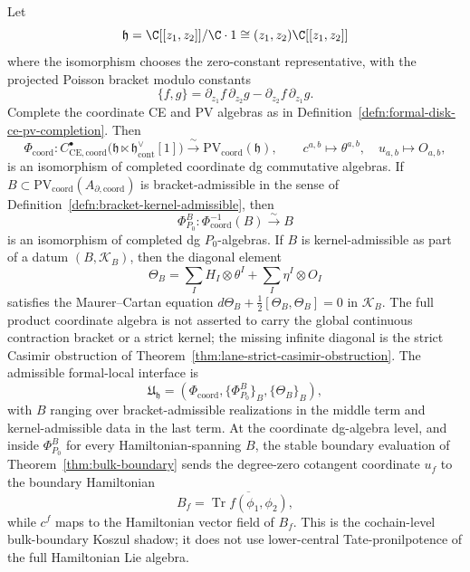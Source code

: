 \begin{thm}\label{thm:formal-disk-completed-ce-pv}
  Let
  \[
    \mathfrak h=\C[[z_1,z_2]]/\C\cdot1
      \cong (z_1,z_2)\C[[z_1,z_2]]
  \]
  where the isomorphism chooses the zero-constant representative, with
  the projected Poisson bracket modulo constants
  \[
    \{f,g\}=\partial_{z_1}f\,\partial_{z_2}g
      -\partial_{z_2}f\,\partial_{z_1}g .
  \]
  Complete the coordinate CE and PV algebras as in
  Definition~\ref{defn:formal-disk-ce-pv-completion}.  Then
  \[
	    \Phi_{\mathrm{coord}}\colon
	    C^\bullet_{\mathrm{CE},\mathrm{coord}}
	    \bigl(\mathfrak h\ltimes\mathfrak h^\vee_{\mathrm{cont}}[1]\bigr)
    \xrightarrow{\ \sim\ }
    \mathrm{PV}_{\mathrm{coord}}(\mathfrak h),
    \qquad
    c^{a,b}\mapsto\theta^{a,b},\quad u_{a,b}\mapsto O_{a,b},
	  \]
	  is an isomorphism of completed coordinate dg commutative algebras.
	  If \(B\subset
	  \mathrm{PV}_{\mathrm{coord}}(A_{\partial,\mathrm{coord}})\) is
	  bracket-admissible in the sense of
	  Definition~\ref{defn:bracket-kernel-admissible}, then
	  \[
	    \Phi^B_{P_0}\colon\Phi_{\mathrm{coord}}^{-1}(B)
	    \xrightarrow{\sim}B
	  \]
	  is an isomorphism of completed dg \(P_0\)-algebras.  If \(B\) is
	  kernel-admissible as part of a datum \((B,\mathcal K_B)\), then the
	  diagonal element
	  \[
	    \Theta_B=\sum_I H_I\otimes\theta^I+\sum_I\eta^I\otimes O_I
	  \]
	  satisfies the Maurer--Cartan equation
	  \(d\Theta_B+\frac12[\Theta_B,\Theta_B]=0\) in \(\mathcal K_B\).  The
	  full product
	  coordinate algebra is not asserted to carry the global continuous
	  contraction bracket or a strict kernel; the missing infinite diagonal
	  is the strict Casimir obstruction of
	  Theorem~\ref{thm:lane-strict-casimir-obstruction}.  The admissible
	  formal-local interface is
	  \[
	    \mathfrak U_{\mathfrak h}
	    =(\Phi_{\mathrm{coord}},\{\Phi^B_{P_0}\}_B,\{\Theta_B\}_B),
	  \]
	  with \(B\) ranging over bracket-admissible realizations in the middle
	  term and kernel-admissible data in the last term.  At the coordinate
	  dg-algebra level, and inside \(\Phi^B_{P_0}\) for every
	  Hamiltonian-spanning \(B\), the stable boundary evaluation of
	  Theorem~\ref{thm:bulk-boundary} sends the degree-zero cotangent
	  coordinate \(u_f\) to the boundary Hamiltonian
  \[
    B_f=\overline{\operatorname{Tr}f(\phi_1,\phi_2)} ,
  \]
  while \(c^f\) maps to the Hamiltonian vector field of \(B_f\).  This
  is the cochain-level bulk-boundary Koszul shadow; it does not use
  lower-central Tate-pronilpotence of the full Hamiltonian Lie algebra.
\end{thm}


